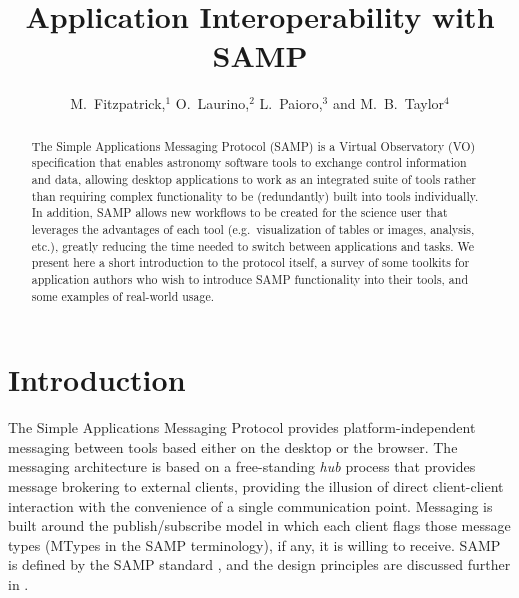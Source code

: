 
\resetcounters




\title{Application Interoperability with SAMP}
\author{M.~Fitzpatrick,$^1$ O.~Laurino,$^2$ L.~Paioro,$^3$ and M.~B.~Taylor$^4$
}



\begin{abstract}
The Simple Applications Messaging Protocol (SAMP) is a Virtual Observatory (VO) specification that enables astronomy software tools to exchange control information and data, allowing desktop applications to work as an integrated suite of tools rather than requiring complex functionality to be (redundantly) built into tools individually. In addition, SAMP allows new workflows to be created for the science user that leverages the advantages of each tool (e.g.\ visualization of tables or images, analysis, etc.), greatly reducing the time needed to switch between applications and tasks. We present here a short introduction to the protocol itself, a survey of some toolkits for application authors who wish to introduce SAMP functionality into their tools, and some examples of real-world usage. \end{abstract}

\section{Introduction}

The Simple Applications Messaging Protocol provides platform-independent messaging between tools based either on the desktop or the browser. The messaging architecture is based on a free-standing {\em hub\/} process that provides message brokering to external clients, providing the illusion of direct client-client interaction with the convenience of a single communication point. Messaging is built around the publish/subscribe model in which each client flags those message types (MTypes in the SAMP terminology), if any, it is willing to receive. SAMP is defined by the SAMP standard \citep{samp1.3}, and the design principles are discussed further in \citet{taylor2011}.

